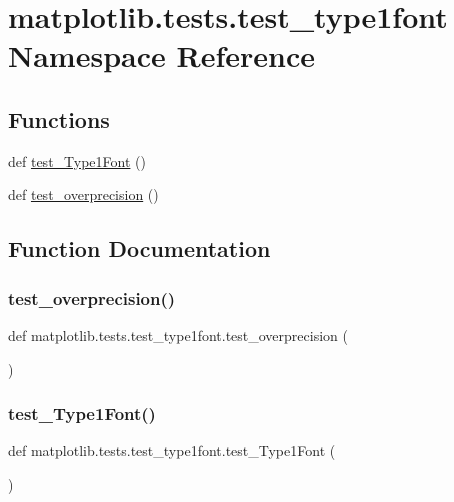 \hypertarget{namespacematplotlib_1_1tests_1_1test__type1font}{}\section{matplotlib.\+tests.\+test\+\_\+type1font Namespace Reference}
\label{namespacematplotlib_1_1tests_1_1test__type1font}
\subsection*{Functions}
\begin{DoxyCompactItemize}
\item 
def \hyperlink{namespacematplotlib_1_1tests_1_1test__type1font_a4685802bec6cd28b5010b10a4ac5a4ec}{test\+\_\+\+Type1\+Font} ()
\item 
def \hyperlink{namespacematplotlib_1_1tests_1_1test__type1font_a3be6e8dd643d503f087c93fc542ded8b}{test\+\_\+overprecision} ()
\end{DoxyCompactItemize}


\subsection{Function Documentation}
\mbox{\label{namespacematplotlib_1_1tests_1_1test__type1font_a3be6e8dd643d503f087c93fc542ded8b}} 
\subsubsection{\texorpdfstring{test\+\_\+overprecision()}{test\_overprecision()}}
{\footnotesize\ttfamily def matplotlib.\+tests.\+test\+\_\+type1font.\+test\+\_\+overprecision (\begin{DoxyParamCaption}{ }\end{DoxyParamCaption})}

\mbox{\label{namespacematplotlib_1_1tests_1_1test__type1font_a4685802bec6cd28b5010b10a4ac5a4ec}} 
\subsubsection{\texorpdfstring{test\+\_\+\+Type1\+Font()}{test\_Type1Font()}}
{\footnotesize\ttfamily def matplotlib.\+tests.\+test\+\_\+type1font.\+test\+\_\+\+Type1\+Font (\begin{DoxyParamCaption}{ }\end{DoxyParamCaption})}

